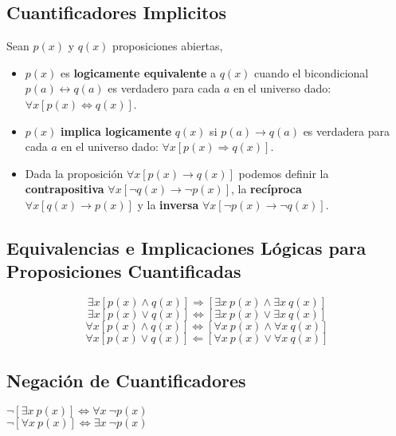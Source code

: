 \documentclass[11pt,a4paper]{article}
\begin{document}
\subsection{Cuantificadores Implicitos}
\noindent Sean $p(x)$ y $q(x)$ proposiciones abiertas, 
\begin{itemize}
\item $p(x)$ es \textbf{logicamente equivalente} a $q(x)$ cuando el bicondicional $p(a) \leftrightarrow q(a)$ es verdadero para cada $a$ en el universo dado: $\forall x [p(x) \Leftrightarrow q(x)]$.
\item $p(x)$ \textbf{implica logicamente} $q(x)$ si $p(a) \rightarrow q(a)$ es verdadera para cada $a$ en el universo dado: $\forall x [p(x)\Rightarrow q(x)]$.
\item Dada la proposici\'on $\forall x [p(x) \rightarrow q(x)]$ podemos definir la \textbf{contrapositiva} $\forall x [\lnot q(x) \rightarrow \lnot p(x)]$, la \textbf{rec\'iproca} $\forall x [q(x) \rightarrow p(x)]$ y la \textbf{inversa} $\forall x [\lnot p(x) \rightarrow \lnot q(x)]$.
\end{itemize}

\subsection{Equivalencias e Implicaciones L\'ogicas para Proposiciones Cuantificadas}
$$\exists x [p(x) \land q(x)] \Rightarrow [\exists x\ p(x) \land \exists x\ q(x)]$$
$$\exists x [p(x) \lor q(x)] \Leftrightarrow [\exists x\ p(x) \lor \exists x\ q(x)]$$
$$\forall x [p(x) \land q(x)] \Leftrightarrow [\forall x\ p(x) \land \forall x\ q(x)]$$
$$\forall x [p(x) \lor q(x)] \Leftarrow [\forall x\ p(x) \lor \forall x\ q(x)]$$

\subsection{Negaci\'on de Cuantificadores}
\begin{multicols}{2}
\quad \quad \quad \quad \quad $\lnot[\exists x\ p(x)] \Leftrightarrow \forall x\ \lnot p(x)$\\
\quad \quad \quad \quad \quad $\lnot[\forall x\ p(x)] \Leftrightarrow \exists x\ \lnot p(x)$
\end{multicols}
\end{document}
